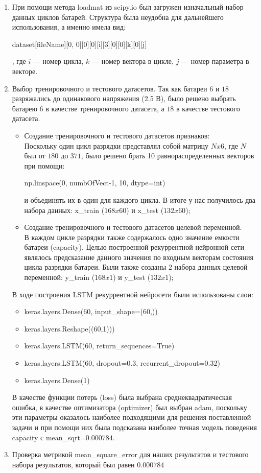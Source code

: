 \documentclass[russian,english,18pt,a4paper,reqno,dviphfm]{article}
\begin{document}
\begin{enumerate}
	\item При помощи метода loadmat из scipy.io был загружен изначальный набор данных циклов батарей. Структура была неудобна для дальнейшего использования, а именно имела вид: 
	\begin{python}
dataset[fileName][0, 0][0][0][i][3][0][0][k][0][j]
	\end{python},
	где $i$ --- номер цикла, $k$ --- номер вектора в цикле, $j$ --- номер параметра в векторе.
	\item Выбор тренировочного и тестового датасетов. Так как батареи $6$ и $18$ разряжались до одинакового напряжения (2.5 В), было решено выбрать батарею $6$ в качестве тренировочного датасета, а $18$ в качестве тестового датасета.
	\begin{itemize}
		\item Создание тренировочного и тестового датасетов признаков: \\ 
		Поскольку один цикл разрядки представлял собой матрицу $Nx6$, где $N$ был от $180$ до $371$, было решено брать 10 равнораспределенных векторов при помощи: \begin{python}
np.linspace(0, numbOfVect-1, 10, dtype=int)
		\end{python} и объединять их в один для каждого цикла. 
		В итоге у нас получилось два набора данных: x\_train ($168x60$) и x\_test ($132x60$);
		\item Создание тренировочного и тестового датасетов целевой переменной. \\ 
		В каждом цикле разрядки также содержалось одно значение емкости батареи (capacity). Целью построенной рекуррентной нейронной сети являлось предсказание данного значения по входным векторам состояния цикла разрядки батареи. Были также созданы 2 набора данных целевой переменной: y\_train ($168x1$) и y\_test ($132x1$);
	\end{itemize}
	В ходе построения LSTM рекуррентной нейросети были использованы слои: 
	\begin{itemize}
	    \item[] keras.layers.Dense(60, input\_shape=(60,))
	    \item[] keras.layers.Reshape((60,1)))
	    \item[] keras.layers.LSTM(60, return\_sequences=True)
	    \item[] keras.layers.LSTM(60, dropout=0.3, recurrent\_dropout=0.32)
	    \item[] keras.layers.Dense(1)
	\end{itemize}
	В качестве функции потерь (loss) была выбрана среднеквадратическая ошибка, в качестве оптимизатора (optimizer) был выбран  adam, поскольку эти параметры оказалось наиболее подходящими для решения поставленной задачи и при помощи них была подсказана наиболее точная модель поведения capacity с mean\_sqrt=$0.000784$. 
	\item Проверка метрикой mean\_square\_error для наших результатов и тестового набора результатов, который был равен $0.000784$
\end{enumerate}
\end{document}

